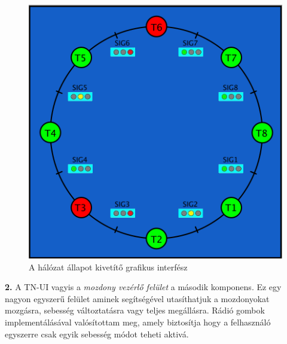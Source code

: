 \documentclass[a4paper,12pt]{article}
\begin{document}
\begin{figure}[!htp]
    \centering
    \includegraphics[scale=0.55]{images/rn_gui.png}
    \caption[RN-GUI megvalósítás]{A hálózat állapot kivetítő grafikus interfész}
    \label{fig:gui_main}
\end{figure}

\textbf{2.} A TN-UI vagyis a \textit{mozdony vezérlő felület} a második komponens. Ez egy nagyon egyszerű felület aminek segítségével utasíthatjuk a mozdonyokat mozgásra, sebesség változtatásra vagy teljes megállásra.
Rádió gombok implementálásával valósítottam meg, amely biztosítja hogy a felhasználó egyszerre csak egyik sebesség módot teheti aktivá.
\end{document}
